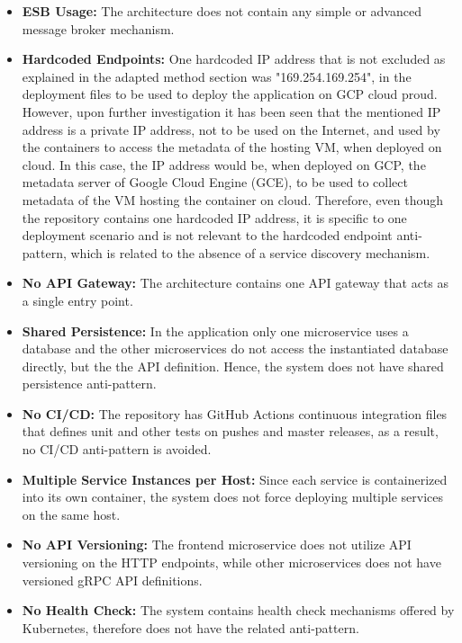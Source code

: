 \documentclass{Configuration_Files/PoliMi3i_thesis}
\begin{document}
\begin{itemize}
    \item \textbf{ESB Usage:} The architecture does not contain any simple or advanced message broker mechanism.
    
    \item \textbf{Hardcoded Endpoints:} One hardcoded IP address that is not excluded as explained in the adapted method section was "169.254.169.254", in the deployment files to be used to deploy the application on GCP cloud proud. 
    However, upon further investigation it has been seen that the mentioned IP address is a private IP address, not to be used on the Internet, and used by the containers to access the metadata of the hosting VM, when deployed on cloud.
    In this case, the IP address would be, when deployed on GCP, the metadata server of Google Cloud Engine (GCE), to be used to collect metadata of the VM hosting the container on cloud.
    Therefore, even though the repository contains one hardcoded IP address, it is specific to one deployment scenario and is not relevant to the hardcoded endpoint anti-pattern, which is related to the absence of a service discovery mechanism.
    
    \item \textbf{No API Gateway:} The architecture contains one API gateway that acts as a single entry point.
    
    \item \textbf{Shared Persistence:} In the application only one microservice uses a database and the other microservices do not access the instantiated database directly, but the the API definition.
    Hence, the system does not have shared persistence anti-pattern.
    
    \item \textbf{No CI/CD:} The repository has GitHub Actions continuous integration files that defines unit and other tests on pushes and master releases, as a result, no CI/CD anti-pattern is avoided.
    
    \item \textbf{Multiple Service Instances per Host:} Since each service is containerized into its own container, the system does not force deploying multiple services on the same host.
    
    \item \textbf{No API Versioning:} The frontend microservice does not utilize API versioning on the HTTP endpoints, while other microservices does not have versioned gRPC API definitions.
    
    \item \textbf{No Health Check:} The system contains health check mechanisms offered by Kubernetes, therefore does not have the related anti-pattern.
    

\end{itemize}
\end{document}
